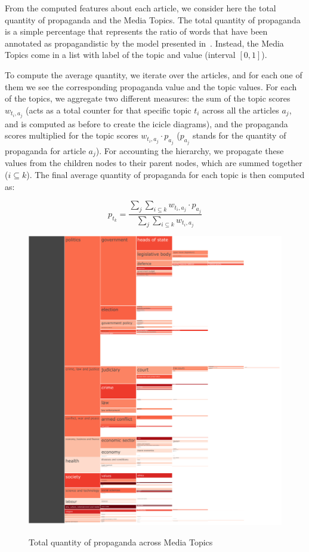 From the computed features about each article, we consider here the total quantity of propaganda and the Media Topics.
The total quantity of propaganda is a simple percentage that represents the ratio of words that have been annotated as propagandistic by the model presented in~\citet{da2019fine}.
Instead, the Media Topics come in a list with label of the topic and value (interval $[0,1]$).

To compute the average quantity, we iterate over the articles, and for each one of them we see the corresponding propaganda value and the topic values. For each of the topics, we aggregate two different measures: the sum of the topic scores $w_{t_{i},a_{j}}$ (acts as a total counter for that specific topic $t_{i}$ across all the articles $a_{j}$, and is computed as before to create the icicle diagrams), and the propaganda scores multiplied for the topic scores $w_{t_{i},a_{j}} \cdot p_{a_{j}}$ ($p_{a_{j}}$ stands for the quantity of propaganda for article $a_{j}$).
For accounting the hierarchy, we propagate these values from the children nodes to their parent nodes, which are summed together ($i\subseteq k$).
The final average quantity of propaganda for each topic is then computed as:

$$ p_{t_{k}} = \frac{ \sum_{j} \sum_{i\subseteq k} w_{t_{i},a_{j}} \cdot p_{a_{j}} }{ \sum_{j} \sum_{i\subseteq k} w_{t_{i},a_{j}} } $$

\begin{figure}[!htbp]
    \centering
    \href{https://martinomensio.github.io/phd-project/figures/baly_iptc_weighted_prop_total.html}{\includegraphics[trim={2.65cm 0cm 0cm 0cm},clip,width=\linewidth]{figures/baly_iptc_weighted_prop_total.pdf}}
    \caption{Total quantity of propaganda across Media Topics}
    \label{fig:baly_iptc_weighted_prop_total}
\end{figure}

